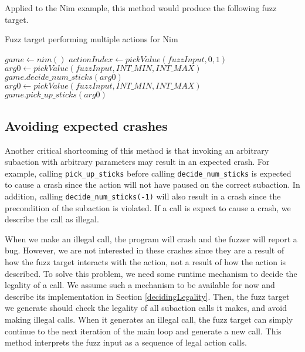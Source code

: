Applied to the Nim example, this method would produce the following fuzz target.
\begin{algorithm}[H]
    \caption{Fuzz target performing multiple actions for Nim}
    \begin{algorithmic}[1]
    \STATE $game \gets nim()$
        \STATE $actionIndex \gets pickValue(fuzzInput, 0, 1)$
            \STATE $arg0 \gets pickValue(fuzzInput, INT\_MIN, INT\_MAX)$
            \STATE $game.decide\_num\_sticks(arg0)$
        \ENDIF
            \STATE $arg0 \gets pickValue(fuzzInput, INT\_MIN, INT\_MAX)$
            \STATE $game.pick\_up\_sticks(arg0)$
        \ENDIF
    \ENDWHILE
    \end{algorithmic}
\end{algorithm}

\subsection{Avoiding expected crashes}\label{avoidingCrashes}
Another critical shortcoming of this method is that invoking an arbitrary subaction with arbitrary parameters may result in an expected crash.
For example, calling \texttt{pick\_up\_sticks} before calling \texttt{decide\_num\_sticks} is expected to cause a crash since the action will not have paused on the correct subaction.
In addition, calling \texttt{decide\_num\_sticks(-1)} will also result in a crash since the precondition of the subaction is violated.
If a call is expect to cause a crash, we describe the call as illegal.

When we make an illegal call, the program will crash and the fuzzer will report a bug.
However, we are not interested in these crashes since they are a result of how the fuzz target interacts with the action, not a result of how the action is described.
To solve this problem, we need some runtime mechanism to decide the legality of a call.
We assume such a mechanism to be available for now and describe its implementation in Section \ref{decidingLegality}.
Then, the fuzz target we generate should check the legality of all subaction calls it makes, and avoid making illegal calls.
When it generates an illegal call, the fuzz target can simply continue to the next iteration of the main loop and generate a new call.
This method interprets the fuzz input as a sequence of legal action calls.

